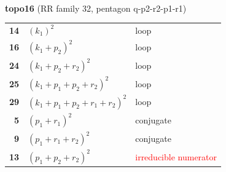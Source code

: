\documentclass[10pt]{article}
\begin{document}
\begin{minipage}[t]{0.48\textwidth}
{}\\[2mm]\textbf{topo16} (RR family 32, pentagon q-p2-r2-p1-r1)\\[2pt]{\footnotesize\begin{tabular}{@{}r@{\ \ }l@{\ \ }l@{}}\textbf{14} & $(k_1)^2$ & loop\\
\textbf{16} & $(k_1+p_2)^2$ & loop\\
\textbf{24} & $(k_1+p_2+r_2)^2$ & loop\\
\textbf{25} & $(k_1+p_1+p_2+r_2)^2$ & loop\\
\textbf{29} & $(k_1+p_1+p_2+r_1+r_2)^2$ & loop\\
\textbf{5} & $(p_1+r_1)^2$ & conjugate\\
\textbf{9} & $(p_1+r_1+r_2)^2$ & conjugate\\
\textbf{13} & $(p_1+p_2+r_2)^2$ & \textcolor{red}{irreducible numerator}\\\end{tabular}}\end{minipage}

\bigskip
\end{document}
